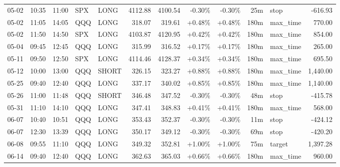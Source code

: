 \documentclass[11pt,a4paper,twoside]{article}
\begin{document}
\begin{center}
\begin{longtable}{>{\color{txtmain}}l l l l l r r r r r >{\color{txtmain}}l r}
05-02 & 10:35 & 11:00 & SPX & LONG & 4112.88 & 4100.54 & \textcolor{lossred}{-0.30\%} & \textcolor{lossred}{-0.30\%} & 25m & stop & \textcolor{lossred}{-616.93} \\
05-02 & 11:05 & 14:05 & QQQ & LONG & 318.07 & 319.61 & \textcolor{wingreen}{+0.48\%} & \textcolor{wingreen}{+0.48\%} & 180m & max\_time & \textcolor{wingreen}{770.00} \\
05-02 & 11:50 & 14:50 & SPX & LONG & 4103.87 & 4120.95 & \textcolor{wingreen}{+0.42\%} & \textcolor{wingreen}{+0.42\%} & 180m & max\_time & \textcolor{wingreen}{854.00} \\
05-04 & 09:45 & 12:45 & QQQ & LONG & 315.99 & 316.52 & \textcolor{wingreen}{+0.17\%} & \textcolor{wingreen}{+0.17\%} & 180m & max\_time & \textcolor{wingreen}{265.00} \\
05-11 & 09:50 & 12:50 & SPX & LONG & 4114.46 & 4128.37 & \textcolor{wingreen}{+0.34\%} & \textcolor{wingreen}{+0.34\%} & 180m & max\_time & \textcolor{wingreen}{695.50} \\
05-12 & 10:00 & 13:00 & QQQ & SHORT & 326.15 & 323.27 & \textcolor{wingreen}{+0.88\%} & \textcolor{wingreen}{+0.88\%} & 180m & max\_time & \textcolor{wingreen}{1,440.00} \\
05-25 & 09:40 & 12:40 & QQQ & LONG & 337.17 & 340.02 & \textcolor{wingreen}{+0.85\%} & \textcolor{wingreen}{+0.85\%} & 180m & max\_time & \textcolor{wingreen}{1,140.00} \\
05-26 & 11:00 & 11:48 & QQQ & SHORT & 346.48 & 347.52 & \textcolor{lossred}{-0.30\%} & \textcolor{lossred}{-0.30\%} & 48m & stop & \textcolor{lossred}{-415.78} \\
05-31 & 11:10 & 14:10 & QQQ & LONG & 347.41 & 348.83 & \textcolor{wingreen}{+0.41\%} & \textcolor{wingreen}{+0.41\%} & 180m & max\_time & \textcolor{wingreen}{568.00} \\
06-07 & 10:40 & 10:51 & QQQ & LONG & 353.43 & 352.37 & \textcolor{lossred}{-0.30\%} & \textcolor{lossred}{-0.30\%} & 11m & stop & \textcolor{lossred}{-424.12} \\
06-07 & 12:30 & 13:39 & QQQ & LONG & 350.17 & 349.12 & \textcolor{lossred}{-0.30\%} & \textcolor{lossred}{-0.30\%} & 69m & stop & \textcolor{lossred}{-420.20} \\
06-08 & 09:55 & 11:10 & QQQ & LONG & 349.32 & 352.81 & \textcolor{wingreen}{+1.00\%} & \textcolor{wingreen}{+1.00\%} & 75m & target & \textcolor{wingreen}{1,397.28} \\
06-14 & 09:40 & 12:40 & QQQ & LONG & 362.63 & 365.03 & \textcolor{wingreen}{+0.66\%} & \textcolor{wingreen}{+0.66\%} & 180m & max\_time & \textcolor{wingreen}{960.00} \\

\end{longtable}
\end{center}
\end{document}
